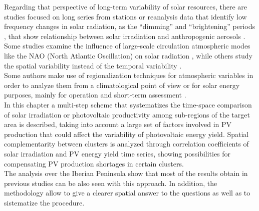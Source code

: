 Regarding that perspective of long-term variability of solar resources, there are studies focused on long series from stations \cite*{Sanchez-Lorenzo2009, Sanchez-Lorenzo2013, vazquez2012interannual} or reanalysis data that identify low frequency changes in solar radiation, as the “dimming” and “brightening” periods \cite*{Wild2005}, that show relationship between solar irradiation and anthropogenic aerosols \cite*{Nabat2014a}. Some studies examine the influence of large-scale circulation atmospheric modes like the NAO (North Atlantic Oscillation) on solar radiation \cite*{Pozo-Vazquez2004, Jerez2013}, while others study the spatial variability instead of the temporal variability \cite*{GueymardWilcox2011a}.\\ 

Some authors make use of regionalization techniques for atmospheric variables in order to analyze them from a climatological point of view \cite*{Argueso2011} or for solar energy purposes, mainly for operation and short-term assessment \cite*{Zagouras2013, Zagouras2014, Zagouras2014b}.\\

In this chapter a multi-step scheme that systematizes the time-space comparison of solar irradiation or photovoltaic productivity among sub-regions of the target area is described, taking into account a large set of factors involved in PV production that could affect the variability of photovoltaic energy yield. Spatial complementarity between clusters is analyzed through correlation coefficients of solar irradiation and PV energy yield time series, showing possibilities for compensating PV production shortages in certain clusters.\\

The analysis over the Iberian Peninsula show that most of the results obtain in previous studies can be also seen with this approach. In addition, the methodology allow to give a clearer spatial answer to the questions as well as to sistematize the procedure.\\


